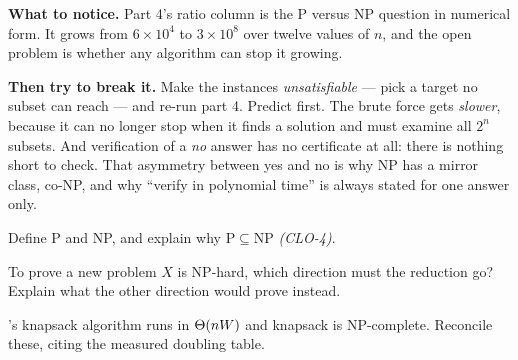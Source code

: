 \begin{lab}
\textbf{What to notice.} Part 4's ratio column is the P versus NP question in
numerical form. It grows from $6 \times 10^{4}$ to $3 \times 10^{8}$ over
twelve values of $n$, and the open problem is whether any algorithm can stop it
growing.

\smallskip
\textbf{Then try to break it.} Make the instances \emph{unsatisfiable} --- pick
a target no subset can reach --- and re-run part 4. Predict first. The brute
force gets \emph{slower}, because it can no longer stop when it finds a
solution and must examine all $2^{n}$ subsets. And verification of a \emph{no}
answer has no certificate at all: there is nothing short to check. That
asymmetry between yes and no is why NP has a mirror class, co-NP, and why
``verify in polynomial time'' is always stated for one answer only.
\end{lab}

\begin{checkpoint}
\begin{tightnum}
  \item Define P and NP, and explain why $\mathrm{P} \subseteq \mathrm{NP}$
        \emph{(CLO-4)}.
  \item To prove a new problem $X$ is NP-hard, which direction must the
        reduction go? Explain what the other direction would prove instead.
  \item {}'s knapsack algorithm runs in $\Theta(nW)$ and knapsack is
        NP-complete. Reconcile these, citing the measured doubling table.
\end{tightnum}
\end{checkpoint}

